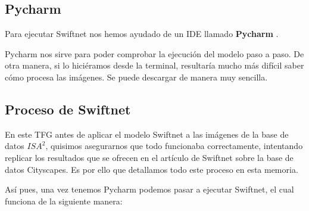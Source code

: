 \subsection{Pycharm}

Para ejecutar Swiftnet nos hemos ayudado de un \ac{IDE} llamado \textbf{Pycharm} \cite{pycharm}.

Pycharm nos sirve para poder comprobar la ejecución del modelo paso a paso. De otra manera, si lo hiciéramos desde la terminal, resultaría mucho más difícil saber cómo procesa las imágenes. Se puede descargar de manera muy sencilla.

\subsection{Proceso de Swiftnet}
En este TFG antes de aplicar el modelo Swiftnet a las imágenes de la base de datos $ISA^2$, quisimos asegurarnos que todo funcionaba correctamente, intentando replicar los resultados que se ofrecen en el artículo de Swiftnet \cite{swiftnet} sobre la base de datos Cityscapes. Es por ello que detallamos todo este proceso en esta memoria.

Así pues, una vez tenemos Pycharm podemos pasar a ejecutar Swiftnet, el cual funciona de la siguiente manera:

